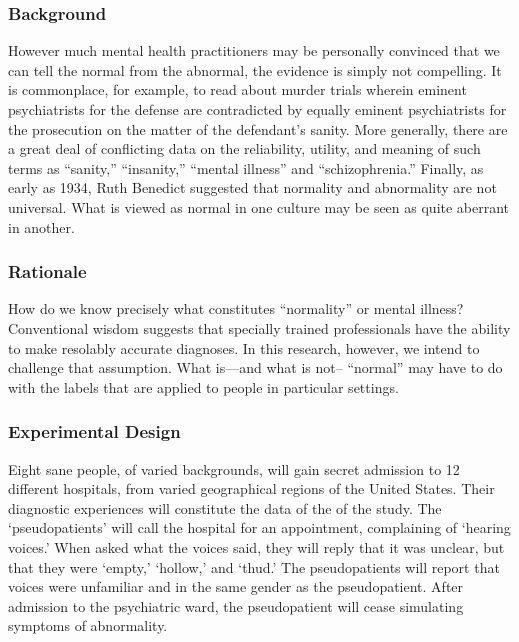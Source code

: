\begin{refsection}
\subsubsection{Background}
\label{background}

However much mental health practitioners may be personally convinced that we can tell the normal from the abnormal, the evidence is simply not compelling. It is commonplace, for example, to read about murder trials wherein eminent psychiatrists for the defense are contradicted by equally eminent psychiatrists for the prosecution on the matter of the defendant's sanity. More generally, there are a great deal of conflicting data on the reliability, utility, and meaning of such terms as ``sanity,'' ``insanity,'' ``mental illness'' and ``schizophrenia.'' Finally, as early as 1934, Ruth Benedict suggested that normality and abnormality are not universal. What is viewed as normal in one culture may be seen as quite aberrant in another.

\subsubsection{Rationale}
\label{rationale}

How do we know precisely what constitutes ``normality'' or mental illness? Conventional wisdom suggests that specially trained professionals have the ability to make resolably accurate diagnoses. In this research, however, we intend to challenge that assumption. What is---and what is not-- ``normal'' may have to do with the labels that are applied to people in particular settings.

\subsubsection{Experimental Design}
\label{experimentaldesign}

Eight sane people, of varied backgrounds, will gain secret admission to 12 different hospitals, from varied geographical regions of the United States. Their diagnostic experiences will constitute the data of the of the study. The `pseudopatients' will call the hospital for an appointment, complaining of `hearing voices.' When asked what the voices said, they will reply that it was unclear, but that they were `empty,' `hollow,' and `thud.' The pseudopatients will report that voices were unfamiliar and in the same gender as the pseudopatient. After admission to the psychiatric ward, the pseudopatient will cease simulating symptoms of abnormality. 


\end{refsection}
